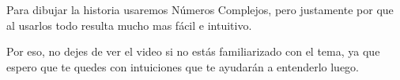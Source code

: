 \documentclass[preview]{standalone}
\begin{document}
\begin{center}
Para dibujar la historia usaremos Números Complejos, pero justamente por que al usarlos todo resulta mucho mas fácil e intuitivo.

Por eso, no dejes de ver el video si no estás familiarizado con el tema, ya que espero que te quedes con intuiciones que te ayudarán a entenderlo luego.
\end{center}
\end{document}
